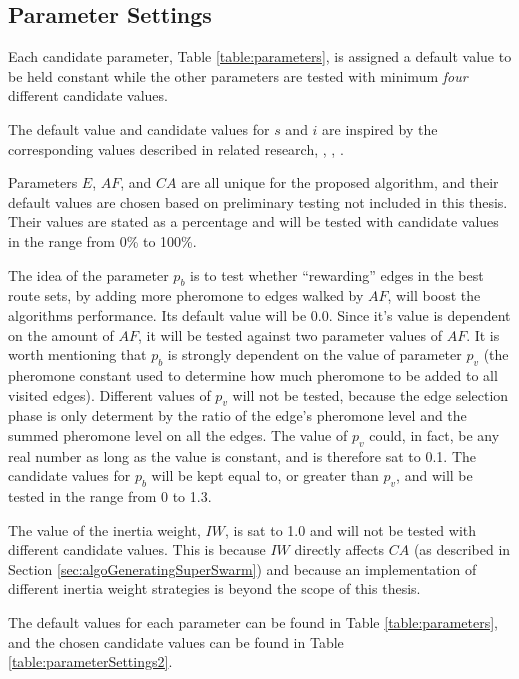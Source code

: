 \subsection{Parameter Settings}
\label{subsec:parameterSettings_setup}
Each candidate parameter, Table \vref{table:parameters}, is assigned a default value to be held constant while the other parameters are tested with minimum \textit{four} different candidate values. 

The default value and candidate values for $s$ and $i$ are inspired by the corresponding values described in related research\citep{salehi-nezhad07}, \citep{poorzahedy11}, \citep{sedighpour14}, \citep{kechagiopoulos14}.

Parameters $E$, $AF$, and $CA$ are all unique for the proposed algorithm, and their default values are chosen based on preliminary testing not included in this thesis. Their values are stated as a percentage and will be tested with candidate values in the range from 0\% to 100\%. %

The idea of the parameter $p_b$ is to test whether ``rewarding'' edges in the best route sets, by adding more pheromone to edges walked by $AF$, will boost the algorithms performance. Its default value will be 0.0. Since it's value is dependent on the amount of $AF$, it will be tested against two parameter values of $AF$. It is worth mentioning that $p_ b$ is strongly dependent on the value of parameter $p_v$ (the pheromone constant used to determine how much pheromone to be added to all visited edges). Different values of $p_v$ will not be tested, because the edge selection phase is only determent by the ratio of the edge's pheromone level and the summed pheromone level on all the edges. The value of $p_v$ could, in fact, be any real number as long as the value is constant, and is therefore sat to 0.1. The candidate values for $p_b$ will be kept equal to, or greater than $p_v$, and will be tested in the range from 0 to 1.3. 

The value of the inertia weight, $IW$, is sat to 1.0 and will not be tested with different candidate values. This is because $IW$ directly affects $CA$ (as described in Section \vref{sec:algoGeneratingSuperSwarm}) and because an implementation of different inertia weight strategies is beyond the scope of this thesis. 

The default values for each parameter can be found in Table \vref{table:parameters}, and the chosen candidate values can be found in Table \vref{table:parameterSettings2}.

